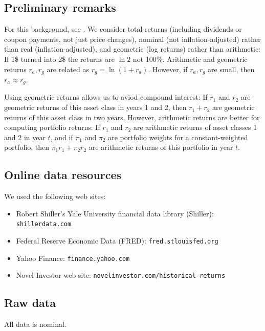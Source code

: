 \documentclass[12pt]{amsart}
\begin{document}
\subsection{Preliminary remarks} For this background, see \cite[Chapter 1, Section 1]{Textbook}. We consider total returns (including dividends or coupon payments, not just price changes), nominal (not inflation-adjusted) rather than real (inflation-adjusted), and geometric (log returns) rather than arithmetic: If 1\$ turned into 2\$ the returns are $\ln 2$ not 100\%. Arithmetic and geometric returns $r_a, r_g$ are related as $r_g = \ln(1 + r_a)$. However, if $r_a, r_g$ are small, then $r_a \approx r_g$. 

Using geometric returns allows us to aviod compound interest: If $r_1$ and $r_2$ are geometric returns of this asset class in years 1 and 2, then $r_1 + r_2$ are geometric returns of this asset class in two years. However, arithmetic returns are better for computing portfolio returns: If $r_1$ and $r_2$ are arithmetic returns of asset classes 1 and 2 in year $t$, and if $\pi_1$ and $\pi_2$ are portfolio weights for a constant-weighted portfolio, then $\pi_1r_1 + \pi_2r_2$ are arithmetic returns of this portfolio in year $t$.

\subsection{Online data resources} We used the following web sites:

\begin{itemize}
\item Robert Shiller's Yale University financial data library (Shiller): \texttt{shillerdata.com}
\item Federal Reserve Economic Data (FRED): \texttt{fred.stlouisfed.org}
\item Yahoo Finance: \texttt{finance.yahoo.com}
\item Novel Investor web site: \texttt{novelinvestor.com/historical-returns}
\end{itemize}

\subsection{Raw data} All data is nominal.
\end{document}
